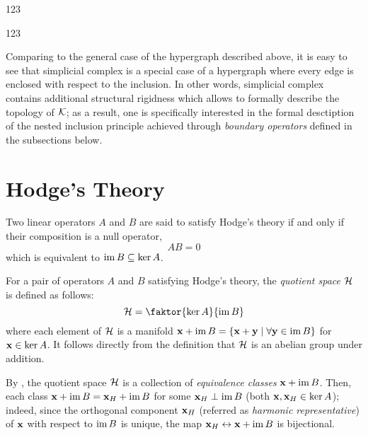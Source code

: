\begin{example}

      123
      
\end{example}

\begin{example}

      123
      
\end{example}


Comparing to the general case of the hypergraph described above, it is easy to see that simplicial complex is a special case of a hypergraph where every edge is enclosed with respect to the inclusion. In other words, simplicial complex contains additional structural rigidness which allows to formally describe the topology of \( \mathcal{K} \); as a result, one is specifically interested in the formal desctiption of the nested inclusion principle achieved through \emph{boundary operators} defined in the subsections below.


\section{ Hodge's Theory }

Two linear operators \( A \) and \( B \) are said to satisfy Hodge's theory if and only if their composition is a null operator, 
\begin{equation}
      A B = 0
\end{equation}
which is equivalent to \( \operatorname{im} B \subseteq \ker A \).

\begin{definition}\label{def:quotient}
      For a pair of operators \( A \) and \( B \) satisfying Hodge's theory, the \emph{quotient space} \( \mathcal{H} \) is defined as follows:
      \begin{equation}
            \mc H = \faktor{ \ker A }{\im B}
      \end{equation}
      where each element of \( \mathcal{H} \) is a manifold \( \mathbf{x} + \operatorname{im} B = \left\{ \mathbf{x} + \mathbf{y} \mid \forall \mathbf{y} \in \operatorname{im} B \right\}\) for \( \mathbf{x} \in \ker A \). It follows directly from the definition that \( \mathcal{H}\) is an abelian group under addition.
\end{definition}

By , the quotient space \( \mathcal{H} \) is a collection of \emph{equivalence classes} \( \mathbf{x} + \operatorname{im} B \). Then, each class \( \mathbf{x} + \operatorname{im} B = \mathbf{x}_H + \operatorname{im} B \) for some \( \mathbf{x}_H \perp \operatorname{im} B \) (both \( \mathbf{x}, \mathbf{x}_H \in \ker A \)); indeed, since the orthogonal component \( \mathbf{x}_H \) (referred as \emph{harmonic representative}) of \( \mathbf{x} \) with respect to \( \operatorname{im} B\) is unique, the map \( \mathbf{x}_H \leftrightarrow \mathbf{x} + \operatorname{im} B \) is bijectional.

